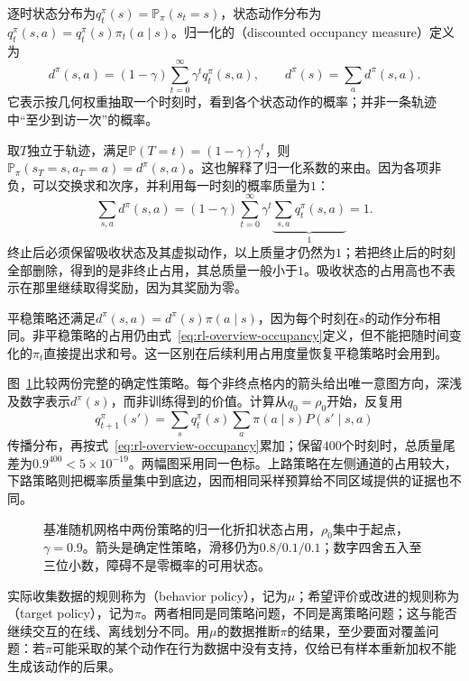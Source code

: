 \begin{definition}[逐时分布与折扣占用度量]
  \label{def:rl-overview-occupancy}
  逐时状态分布为$q_t^\pi(s)=\mathbb P_\pi(s_t=s)$，状态动作分布为$q_t^\pi(s,a)=q_t^\pi(s)\pi_t(a\mid s)$。归一化的（discounted occupancy measure）定义为
  \begin{equation}
    d^\pi(s,a)=(1-\gamma)\sum_{t=0}^{\infty}
      \gamma^t q_t^\pi(s,a),\qquad
    d^\pi(s)=\sum_a d^\pi(s,a).
    \label{eq:rl-overview-occupancy}
  \end{equation}
  它表示按几何权重抽取一个时刻时，看到各个状态动作的概率；并非一条轨迹中“至少到访一次”的概率。
\end{definition}

取$T$独立于轨迹，满足$\mathbb P(T=t)=(1-\gamma)\gamma^t$，则$\mathbb P_\pi(s_T=s,a_T=a)=d^\pi(s,a)$。这也解释了归一化系数的来由。因为各项非负，可以交换求和次序，并利用每一时刻的概率质量为$1$：
\[
  \sum_{s,a}d^\pi(s,a)
  =(1-\gamma)\sum_{t=0}^{\infty}\gamma^t
    \underbrace{\sum_{s,a}q_t^\pi(s,a)}_{1}=1.
\]
终止后必须保留吸收状态及其虚拟动作，以上质量才仍然为$1$；若把终止后的时刻全部删除，得到的是非终止占用，其总质量一般小于$1$。吸收状态的占用高也不表示在那里继续取得奖励，因为其奖励为零。

平稳策略还满足$d^\pi(s,a)=d^\pi(s)\pi(a\mid s)$，因为每个时刻在$s$的动作分布相同。非平稳策略的占用仍由式~\eqref{eq:rl-overview-occupancy}定义，但不能把随时间变化的$\pi_t$直接提出求和号。这一区别在后续利用占用度量恢复平稳策略时会用到。

图~\ref{fig:rl-overview-occupancy}比较两份完整的确定性策略。每个非终点格内的箭头给出唯一意图方向，深浅及数字表示$d^\pi(s)$，而非训练得到的价值。计算从$q_0=\rho_0$开始，反复用
\[
 q_{t+1}^\pi(s')=\sum_s q_t^\pi(s)
                    \sum_a\pi(a\mid s)P(s'\mid s,a)
\]
传播分布，再按式~\eqref{eq:rl-overview-occupancy}累加；保留$400$个时刻时，总质量尾差为$0.9^{400}<5\times10^{-19}$。两幅图采用同一色标。上路策略在左侧通道的占用较大，下路策略则把概率质量集中到底边，因而相同采样预算给不同区域提供的证据也不同。

\begin{figure}[htbp]
  \centering
  
  \caption{基准随机网格中两份策略的归一化折扣状态占用，$\rho_0$集中于起点，$\gamma=0.9$。箭头是确定性策略，滑移仍为$0.8/0.1/0.1$；数字四舍五入至三位小数，障碍不是零概率的可用状态。}
  \label{fig:rl-overview-occupancy}
\end{figure}

实际收集数据的规则称为（behavior policy），记为$\mu$；希望评价或改进的规则称为（target policy），记为$\pi$。两者相同是同策略问题，不同是离策略问题；这与能否继续交互的在线、离线划分不同。用$\mu$的数据推断$\pi$的结果，至少要面对覆盖问题：若$\pi$可能采取的某个动作在行为数据中没有支持，仅给已有样本重新加权不能生成该动作的后果。

